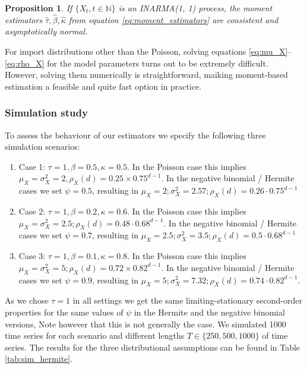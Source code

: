 \documentclass{article}
\newtheorem{proposition}{Proposition}
\begin{document}
\begin{proposition}
If $\{X_t, t \in \mathbb{N}\}$ is an INARMA(1, 1) process, the moment estimators $\hat{\tau}, \hat{\beta}, \hat{\kappa}$ from equation \eqref{eq:moment_estimators} are consistent and asymptotically normal.\label{proposition:moments}
\end{proposition}

For import distributions other than the Poisson, solving equations \eqref{eq:mu_X}--\eqref{eq:rho_X} for the model parameters turns out to be extremely difficult. However, solving them numerically is straightforward, maiking moment-based estimation a feasible and quite fast option in practice.


\subsubsection{Simulation study}

To assess the behaviour of our estimators we specify the following three simulation scenarios:


\begin{enumerate}
\item Case 1: $\tau = 1, \beta = 0.5, \kappa = 0.5$. In the Poisson case this implies $\mu_X = \sigma^2_X = 2, \rho_X(d) = 0.25 \times 0.75^{d - 1}$. In the negative binomial / Hermite cases we set $\psi = 0.5$, resulting in $\mu_X = 2; \sigma^2_X = 2.57; \rho_X(d) = 0.26\cdot 0.75^{d - 1}$
\item Case 2: $\tau = 1, \beta = 0.2, \kappa = 0.6$. In the Poisson case this implies $\mu_X = \sigma^2_X = 2.5; \rho_X(d) = 0.48 \cdot 0.68^{d - 1}$. In the negative binomial / Hermite cases we set $\psi = 0.7$, resulting in $\mu_X = 2.5; \sigma^2_X = 3.5; \rho_X(d) = 0.5\cdot 0.68^{d - 1}$
\item Case 3: $\tau = 1, \beta = 0.1, \kappa = 0.8$. In the Poisson case this implies $\mu_X = \sigma^2_X = 5; \rho_X(d) = 0.72 \times 0.82^{d - 1}$. In the negative binomial / Hermite cases we set $\psi = 0.9$, resulting in $\mu_X = 5; \sigma^2_X = 7.32; \rho_X(d) = 0.74\cdot 0.82^{d - 1}$.\end{enumerate}

\noindent As we chose $\tau = 1$ in all settings we get the same limiting-stationary second-order properties for the same values of $\psi$ in the Hermite and the negative binomial versions,  Note however that this is not generally the case. We simulated 1000 time series for each scenario and different lengths $T \in \{250, 500, 1000\}$ of time series. The results for the three distributional assumptions can be found in Table \ref{tab:sim_hermite}.
\end{document}

